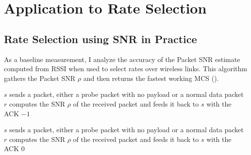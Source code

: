 \ifx\mainfile\undefined

\setcounter{chapter}{6} %
\fi

\cleardoublepage
\chapter{Application to Rate Selection}
\label{chap:rate}

\section{Rate Selection using SNR in Practice}
As a baseline measurement, I analyze the accuracy of the Packet SNR estimate computed from RSSI when used to select rates over wireless links. This algorithm gathers the Packet SNR $\rho$ and then returns the fastest working MCS ().

\begin{algorithm}[t]
\caption{\label{alg:rate_select_snr}}
\begin{algorithmic}
\STATE $s$ sends a packet, either a probe packet with no payload or a normal data packet
\STATE $r$ computes the SNR $\rho$ of the received packet and feeds it back to $s$ with the ACK
\RETURN $-1$ \hfill {}
\ELSE
{} \hfill {}
\ENDIF
\end{algorithmic}
\end{algorithm}

\begin{algorithm}[t]
\caption{\label{alg:get_bitrate_threshold}}
\begin{algorithmic}
\IF{$\rho > \tau$}
 \hfill {}
\ELSE
{} \hfill {}
\ENDIF
\end{algorithmic}
\end{algorithm}

\begin{algorithm}[t]
\caption{\label{alg:predict_rate_snr}}
\begin{algorithmic}
\STATE $s$ sends a packet, either a probe packet with no payload or a normal data packet
\STATE $r$ computes the SNR $\rho$ of the received packet and feeds it back to $s$ with the ACK
\RETURN {}
\ELSE
\RETURN $0$ \hfill {}
\ENDIF
\end{algorithmic}
\end{algorithm}

